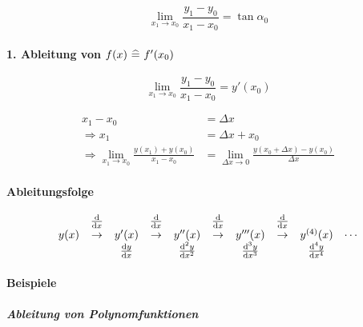 \[
	\lim_{x_1 \rightarrow x_0} \frac{y_1 - y_0}{x_1 - x_0} = \tan \alpha_0
\]

\paragraph{1. Ableitung von \(f(x) \ \widehat{=}\  f'(x_0)\)}

\[
	\lim_{x_1 \rightarrow x_0} \frac{y_1 - y_0}{x_1 - x_0}= y'(x_0)
\]

\begin{align*}
	x_1 - x_0       & = \Delta x                                                                  \\
	\Rightarrow x_1 & = \Delta x + x_0                                                            \\
	\Rightarrow \lim_{x_1 \rightarrow x_0} \frac{y(x_1) + y(x_0)}{x_1 - x_0}
	                & = \lim_{\Delta x \rightarrow 0} \frac{y(x_0 + \Delta x) - y(x_0)}{\Delta x}
\end{align*}

\paragraph{Ableitungsfolge}

\[
	\begin{array}{ccccccccccc}
		 & \frac{\diff}{\diff x} &
		 & \frac{\diff}{\diff x} &
		 & \frac{\diff}{\diff x} &
		 & \frac{\diff}{\diff x} &                             \\
		y(x)
		 & \rightarrow           & y'(x)
		 & \rightarrow           & y''(x)
		 & \rightarrow           & y'''(x)
		 & \rightarrow           & y^{(4)}(x)
		 & \cdots                                              \\
		 &                       & \frac{\diff y}{\diff x}
		 &                       & \frac{\diff^2 y}{\diff x^2}
		 &                       & \frac{\diff^3 y}{\diff x^3}
		 &                       & \frac{\diff^4 y}{\diff x^4}
	\end{array}
\]

\paragraph{Beispiele}

\subparagraph{Ableitung von Polynomfunktionen}

